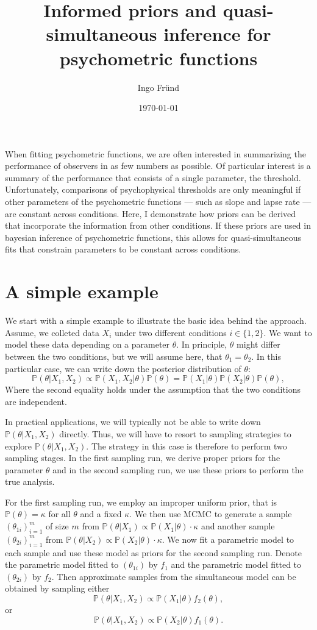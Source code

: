 \documentclass[a4paper,11pt]{scrartcl}
\title{Informed priors and quasi-simultaneous inference for psychometric functions}
\author{Ingo Fründ}
\date{\today}
\def\prob{\mathbb{P}}
\begin{document}
\maketitle
When fitting psychometric functions, we are often interested in summarizing the performance of observers in as few numbers as possible.
Of particular interest is a summary of the performance that consists of a single parameter, the threshold.
Unfortunately, comparisons of psychophysical thresholds are only meaningful if other parameters of the psychometric functions --- such as slope and lapse rate --- are constant across conditions.
Here, I demonstrate how priors can be derived that incorporate the information from other conditions.
If these priors are used in bayesian inference of psychometric functions, this allows for quasi-simultaneous fits that constrain parameters to be constant across conditions.

\section{A simple example}

We start with a simple example to illustrate the basic idea behind the approach.
Assume, we colleted data $X_i$ under two different conditions $i\in\{1,2\}$.
We want to model these data depending on a parameter $\theta$.
In principle, $\theta$ might differ between the two conditions, but we will assume here, that $\theta_1=\theta_2$.
In this particular case, we can write down the posterior distribution of $\theta$:
%
$$
\prob(\theta|X_1,X_2) \propto \prob(X_1,X_2|\theta) \prob(\theta) = \prob(X_1|\theta)\prob(X_2|\theta)\prob(\theta),
$$
%
Where the second equality holds under the assumption that the two conditions are independent.

In practical applications, we will typically not be able to write down $\prob(\theta|X_1,X_2)$ directly.
Thus, we will have to resort to sampling strategies to explore $\prob(\theta|X_1,X_2)$.
The strategy in this case is therefore to perform two sampling stages.
In the first sampling run, we derive proper priors for the parameter $\theta$ and in the second sampling run, we use these priors to perform the true analysis.

For the first sampling run, we employ an improper uniform prior, that is $\prob(\theta)=\kappa$ for all $\theta$ and a fixed $\kappa$.
We then use MCMC to generate a sample $(\theta_{1i})_{i=1}^m$ of size $m$ from $\prob(\theta|X_1)\propto\prob(X_1|\theta)\cdot\kappa$ and another sample
$(\theta_{2i})_{i=1}^m$ from $\prob(\theta|X_2)\propto\prob(X_2|\theta)\cdot\kappa$.
We now fit a parametric model to each sample and use these model as priors for the second sampling run.
Denote the parametric model fitted to $(\theta_{1i})$ by $f_1$ and the parametric model fitted to $(\theta_{2i})$ by $f_2$.
Then approximate samples from the simultaneous model can be obtained by sampling either
%
$$
\prob(\theta|X_1,X_2) \propto\prob(X_1|\theta)f_2(\theta),
$$
%
or
%
$$
\prob(\theta|X_1,X_2) \propto\prob(X_2|\theta)f_1(\theta).
$$
%
\end{document}
